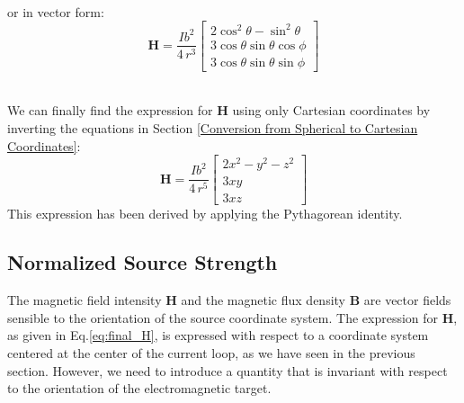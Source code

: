 \documentclass[main]{subfiles}
\begin{document}
\noindent\\
or in vector form:
\[
 \mathbf{H} = \frac{I b^2}{4 \, r^3} 
    \begin{bmatrix}
        2\cos^2\theta - \sin^2\theta \\
        3\cos\theta \sin\theta \cos\phi \\
        3\cos\theta \sin\theta \sin\phi
    \end{bmatrix}
\]

\noindent\\
We can finally find the expression for $\mathbf{H}$ 
using only Cartesian coordinates by inverting the 
equations in Section \ref{Conversion from Spherical to 
Cartesian Coordinates}:
\begin{equation}
 \mathbf{H} = \frac{I b^2}{4 \, r^5} 
    \begin{bmatrix}
        2x^2 - y^2 - z^2 \\
        3xy \\
        3xz
    \end{bmatrix}
\label{eq:final_H}
\end{equation}
This expression has been derived by applying the Pythagorean identity.

\subsection{Normalized Source Strength}
The magnetic field intensity $\mathbf{H}$ and the magnetic flux density $\mathbf{B}$ are vector fields 
sensible to the orientation of the source coordinate system. 
The expression for $\mathbf{H}$, as given in Eq.\ref{eq:final_H}, is expressed with respect to a 
coordinate system centered at the center of the current loop, as we have seen in the previous section.
However, we need to introduce a quantity that is invariant with
respect to the orientation of the electromagnetic target.
\end{document}
